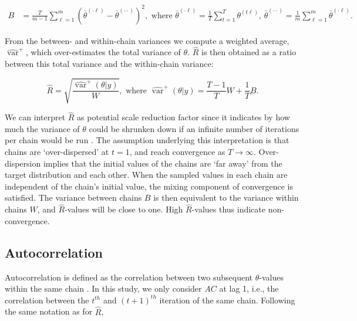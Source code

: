 \documentclass[Royal,times,sageh]{sagej}
\begin{document}
\begin{align*}
B&=\frac{T}{m-1} \sum_{\ell=1}^{m}\left(\bar{\theta}^{(\cdot \ell)}-\bar{\theta}^{(\cdot \cdot)}\right)^{2}, \text { where } \bar{\theta}^{(\cdot \ell)}=\frac{1}{T} \sum_{t=1}^{T} \theta^{(t \ell)} \text{, } \bar{\theta}^{(\cdot \cdot)}=\frac{1}{m} \sum_{\ell=1}^{m} \bar{\theta}^{(\cdot \ell)}. 
\end{align*}

\noindent From the between- and within-chain variances we compute a weighted average, \(\widehat{\operatorname{var}}^{+}\), which over-estimates the total variance of \(\theta\). \(\widehat{R}\) is then obtained as a ratio between this total variance and the within-chain variance:

\begin{equation*}
\widehat{R}=\sqrt{\frac{\widehat{\operatorname{var}}^{+}(\theta | y)}{W}},
\text{ where } \widehat{\operatorname{var}}^{+}(\theta | y)=\frac{T-1}{T} W+\frac{1}{T} B.
\end{equation*}

We can interpret \(\widehat{R}\) as potential scale reduction factor since it indicates by how much the variance of \(\theta\) could be shrunken down if an infinite number of iterations per chain would be run \citep{gelm92}. The assumption underlying this interpretation is that chains are `over-dispersed' at \(t=1\), and reach convergence as \(T \to \infty\). Over-dispersion implies that the initial values of the chains are `far away' from the target distribution and each other. When the sampled values in each chain are independent of the chain's initial value, the mixing component of convergence is satisfied. The variance between chains \(B\) is then equivalent to the variance within chains \(W\), and \(\widehat{R}\)-values will be close to one. High \(\widehat{R}\)-values thus indicate non-convergence.

\hypertarget{autocorrelation}{%
\subsection{Autocorrelation}\label{autocorrelation}}

Autocorrelation is defined as the correlation between two subsequent \(\theta\)-values within the same chain \citep[p.~147]{lync07}. In this study, we only consider \(AC\) at lag 1, i.e., the correlation between the \(t^{th}\) and \((t+1)^{th}\) iteration of the same chain. Following the same notation as for \(\widehat{R}\),
\end{document}
